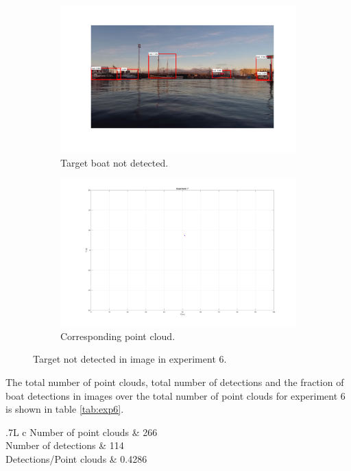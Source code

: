 \begin{figure}[H]
	\centering
	\begin{subfigure}[t]{.5\linewidth}
		\centering
		\includegraphics[width=\linewidth]{fig/ex6_miss.png}
		\caption{Target boat not detected.}
		\label{fig:sub_ex6_issue}
	\end{subfigure}%
	\begin{subfigure}[t]{.5\linewidth}
		\centering
		\includegraphics[width=\linewidth]{fig/ex6_miss_pc.png}
		\caption{Corresponding point cloud.}
		\label{fig:sub_ex6_issue2}
	\end{subfigure}
	\caption{Target not detected in image in experiment 6.}
	\label{fig:issues_ex6}
\end{figure}
The total number of point clouds, total number of detections and the fraction of boat detections in images over the total number of point clouds for experiment 6 is shown in table \ref{tab:exp6}.
\begin{table}[H]
	\centering
	\begin{tabularx}{.7\linewidth}{L c}
		\toprule
		Number of point clouds & 266\\
		\midrule
		Number of detections & 114\\
		\midrule
		Detections/Point clouds & 0.4286 \\
		\bottomrule
	\end{tabularx}
	\caption{Data from experiment 6.}
	\label{tab:exp6}
\end{table}
